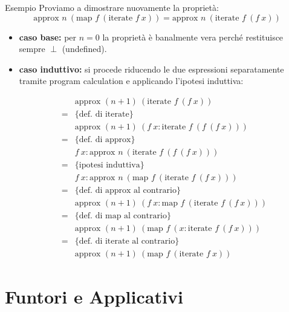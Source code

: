 \begin{gframe}{Esempio}
Proviamo a dimostrare nuovamente la proprietà:
$$\text{approx } n \ (\text{map } f \ (\text{iterate } f \ x)) = \text{approx } n \ (\text{iterate } f \ (f \ x))$$

\begin{itemize}
    \item \textbf{caso base:} per $n = 0$ la proprietà è banalmente vera perché  restituisce sempre $\perp$ (undefined).

    \item \textbf{caso induttivo:} si procede riducendo le due espressioni separatamente tramite program calculation e applicando l'ipotesi induttiva:

\begin{align*}
    & \text{approx } (n+1) \ (\text{iterate } f \ (f \ x)) \\
    = & \{ \text{def. di iterate} \} \\
    & \text{approx } (n+1) \ (f \ x : \text{iterate } f \ (f \ (f \ x))) \\
    = & \{ \text{def. di approx} \} \\
    & f \ x : \text{approx } n \ (\text{iterate } f \ (f \ (f \ x))) \\
    = & \{ \text{ipotesi induttiva} \} \\
    & f \ x : \text{approx } n \ (\text{map } f \ (\text{iterate } f \ (f \ x))) \\
    = & \{ \text{def. di approx al contrario} \} \\
    & \text{approx } (n+1) \ (f \ x : \text{map } f \ (\text{iterate } f \ (f \ x))) \\
    = & \{ \text{def. di map al contrario} \} \\
    & \text{approx } (n+1) \ (\text{map } f \ (x : \text{iterate } f \ (f \ x))) \\
    = & \{ \text{def. di iterate al contrario} \} \\
    & \text{approx } (n+1) \ (\text{map } f \ (\text{iterate } f \ x))
\end{align*}
\end{itemize}
\end{gframe}

\section{Funtori e Applicativi}


